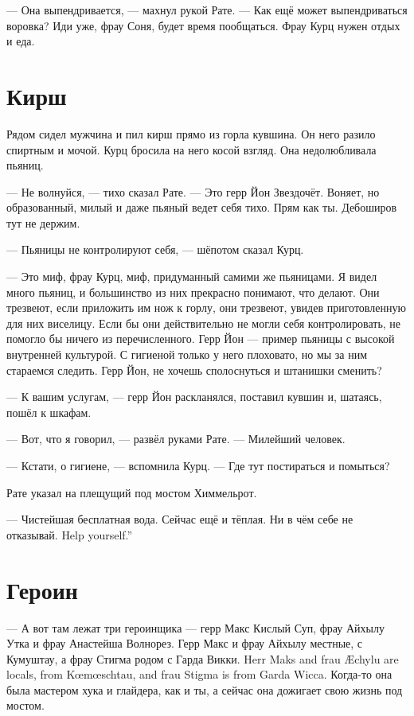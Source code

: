 --- Она выпендривается, --- махнул рукой Рате.
--- Как ещё может выпендриваться воровка?
Иди уже, фрау Соня, будет время пообщаться.
Фрау Курц нужен отдых и еда.

\section{Кирш}

Рядом сидел мужчина и пил кирш прямо из горла кувшина.
Он него разило спиртным и мочой.
Курц бросила на него косой взгляд.
Она недолюбливала пьяниц.

--- Не волнуйся, --- тихо сказал Рате.
--- Это герр Йон Звездочёт.
Воняет, но образованный, милый и даже пьяный ведет себя тихо.
Прям как ты.
Дебоширов тут не держим.

--- Пьяницы не контролируют себя, --- шёпотом сказал Курц.

--- Это миф, фрау Курц, миф, придуманный самими же пьяницами.
Я видел много пьяниц, и большинство из них прекрасно понимают, что делают.
Они трезвеют, если приложить им нож к горлу, они трезвеют, увидев приготовленную для них виселицу.
Если бы они действительно не могли себя контролировать, не помогло бы ничего из перечисленного.
Герр Йон --- пример пьяницы с высокой внутренней культурой.
С гигиеной только у него плоховато, но мы за ним стараемся следить.
Герр Йон, не хочешь сполоснуться и штанишки сменить?

--- К вашим услугам, --- герр Йон раскланялся, поставил кувшин и, шатаясь, пошёл к шкафам.

--- Вот, что я говорил, --- развёл руками Рате.
--- Милейший человек.

--- Кстати, о гигиене, --- вспомнила Курц.
--- Где тут постираться и помыться?

Рате указал на плещущий под мостом Химмельрот.

--- Чистейшая бесплатная вода.
Сейчас ещё и тёплая.
{Ни в чём себе не отказывай.}
{Help yourself.''}

\section{Героин}

--- А вот там лежат три героинщика --- герр Макс Кислый Суп, фрау Айхылу Утка и фрау Анастейша Волнорез.
{Герр Макс и фрау Айхылу местные, с Кумуштау, а фрау Стигма родом с Гарда Викки.}
{Herr Maks and frau \AE{}chylu are locals, from K\oe{}m\oe{}schtau, and frau Stigma is from Garda Wicca.}
Когда-то она была мастером хука и глайдера, как и ты, а сейчас она дожигает свою жизнь под мостом.

